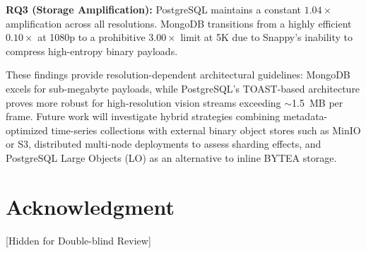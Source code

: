 \documentclass[conference, a4paper]{IEEEtran}
\begin{document}
\textbf{RQ3 (Storage Amplification):} PostgreSQL maintains a constant $1.04\times$ amplification across all resolutions. MongoDB transitions from a highly efficient $0.10\times$ at 1080p to a prohibitive $3.00\times$ limit at 5K due to Snappy's inability to compress high-entropy binary payloads.

These findings provide resolution-dependent architectural guidelines: MongoDB excels for sub-megabyte payloads, while PostgreSQL's TOAST-based architecture proves more robust for high-resolution vision streams exceeding $\sim$1.5~MB per frame. Future work will investigate hybrid strategies combining metadata-optimized time-series collections with external binary object stores such as MinIO or S3, distributed multi-node deployments to assess sharding effects, and PostgreSQL Large Objects (LO) as an alternative to inline BYTEA storage.


\section*{Acknowledgment}
[Hidden for Double-blind Review]




\end{document}
